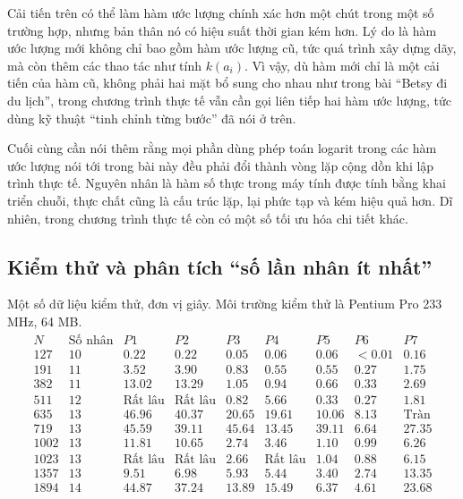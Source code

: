 \documentclass[11pt]{article}
\begin{document}
Cải tiến trên có thể làm hàm ước lượng chính xác hơn một chút trong một số
trường hợp, nhưng bản thân nó có hiệu suất thời gian kém hơn. Lý do là hàm
ước lượng mới không chỉ bao gồm hàm ước lượng cũ, tức quá trình xây dựng dãy,
mà còn thêm các thao tác như tính \(k(a_i)\). Vì vậy, dù hàm mới chỉ là một
cải tiến của hàm cũ, không phải hai mặt bổ sung cho nhau như trong bài
``Betsy đi du lịch'', trong chương trình thực tế vẫn cần gọi liên tiếp hai
hàm ước lượng, tức dùng kỹ thuật ``tinh chỉnh từng bước'' đã nói ở trên.

Cuối cùng cần nói thêm rằng mọi phần dùng phép toán logarit trong các hàm ước
lượng nói tới trong bài này đều phải đổi thành vòng lặp cộng dồn khi lập
trình thực tế. Nguyên nhân là hàm số thực trong máy tính được tính bằng khai
triển chuỗi, thực chất cũng là cấu trúc lặp, lại phức tạp và kém hiệu quả
hơn. Dĩ nhiên, trong chương trình thực tế còn có một số tối ưu hóa chi tiết
khác.

\subsection{Kiểm thử và phân tích ``số lần nhân ít nhất''}

Một số dữ liệu kiểm thử, đơn vị giây. Môi trường kiểm thử là Pentium Pro
233 MHz, 64 MB.
\[
\begin{array}{r|r|c|c|c|c|c|c|c}
N & \text{Số nhân} & P1 & P2 & P3 & P4 & P5 & P6 & P7\\
\hline
127 & 10 & 0.22 & 0.22 & 0.05 & 0.06 & 0.06 & <0.01 & 0.16\\
191 & 11 & 3.52 & 3.90 & 0.83 & 0.55 & 0.55 & 0.27 & 1.75\\
382 & 11 & 13.02 & 13.29 & 1.05 & 0.94 & 0.66 & 0.33 & 2.69\\
511 & 12 & \text{Rất lâu} & \text{Rất lâu} & 0.82 & 5.66 & 0.33 & 0.27 & 1.81\\
635 & 13 & 46.96 & 40.37 & 20.65 & 19.61 & 10.06 & 8.13 & \text{Tràn}\\
719 & 13 & 45.59 & 39.11 & 45.64 & 13.45 & 39.11 & 6.64 & 27.35\\
1002 & 13 & 11.81 & 10.65 & 2.74 & 3.46 & 1.10 & 0.99 & 6.26\\
1023 & 13 & \text{Rất lâu} & \text{Rất lâu} & 2.66 & \text{Rất lâu} & 1.04 & 0.88 & 6.15\\
1357 & 13 & 9.51 & 6.98 & 5.93 & 5.44 & 3.40 & 2.74 & 13.35\\
1894 & 14 & 44.87 & 37.24 & 13.89 & 15.49 & 6.37 & 4.61 & 23.68
\end{array}
\]
\end{document}
